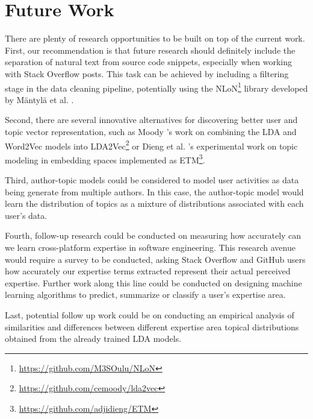     \section{Future Work\label{sec:futurework}} 
    
        There are plenty of research opportunities to be built on top of the current work. First, our recommendation is that future research should definitely include the separation of natural text from source code snippets, especially when working with Stack Overflow posts. This task can be achieved by including a filtering stage in the data cleaning pipeline, potentially using the  NLoN\footnote{\url{https://github.com/M3SOulu/NLoN}} library developed by M{\"a}ntyl{\"a} et al. \cite{mantyla2018natural}.
        
        Second, there are several innovative alternatives for discovering better user and topic vector representation, such as Moody \cite{moody2016mixing}'s work on combining the LDA and Word2Vec models into LDA2Vec\footnote{\url{https://github.com/cemoody/lda2vec}} or Dieng et al. \cite{dieng2019topic}'s experimental work on topic modeling in embedding spaces implemented as ETM\footnote{\url{https://github.com/adjidieng/ETM}}.
        
        Third, author-topic models \cite{rosen2012author} could be considered to model user activities as data being generate from multiple authors. In this case, the author-topic model would learn the distribution of topics as a mixture of distributions associated with each user's data. 
        
        Fourth, follow-up research could be conducted on measuring how accurately can we learn cross-platform expertise in software engineering. This research avenue would require a survey to be conducted, asking Stack Overflow and GitHub users how accurately our expertise terms extracted represent their actual perceived expertise. Further work along this line could be conducted on designing machine learning algorithms to predict, summarize or classify a user's expertise area.
        
        Last, potential follow up work could be on conducting an empirical analysis of similarities and differences between different expertise area topical distributions obtained from the already trained LDA models.